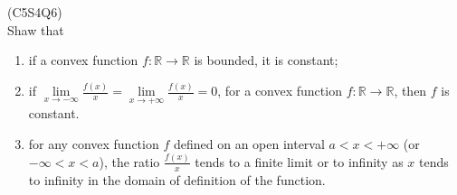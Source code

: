 \begin{prb}
    (C5S4Q6) \\
    Shaw that 
    \begin{enumerate}
        \item[a)] if a convex function $f : \mathbb{R} \to \mathbb{R}$ is bounded, it is constant;
        \item[b)] if $\lim\limits_{x \to -\infty} \frac{f(x)}{x} = \lim\limits_{x \to +\infty} \frac{f(x)}{x} = 0$, for a convex function $f : \mathbb{R} 
        \to \mathbb{R}$, then $f$ is constant.
        \item[c)] for any convex function $f$ defined on an open interval $a < x < +\infty$ (or $-\infty < x < a$), the ratio $\frac{f(x)}{x}$ tends to a 
        finite limit or to infinity as $x$ tends to infinity in the domain of definition of the function.
    \end{enumerate}
\end{prb}
